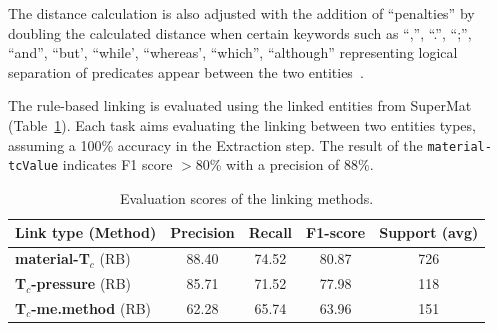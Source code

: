 \documentclass{article}
\newcommand{\tc}{T$_{c}$}
\begin{document}
The distance calculation is also adjusted with the addition of ``penalties'' by doubling the calculated distance when certain keywords such as ``,'', ``.'', ``;'', ``and'', ``but', ``while', ``whereas', ``which'', ``although'' representing logical separation of predicates appear between the two entities~\cite{oka2021table}. 

The rule-based linking is evaluated using the linked entities from SuperMat~\cite{foppiano2021supermat} (Table~\ref{table:evaluation-linking}). 
Each task aims evaluating the linking between two entities types, assuming a 100\% accuracy in the Extraction step. 
The result of the \texttt{material-tcValue} indicates F1 score $>$80\% with a precision of 88\%.

\begin{table}[ht]
\centering\small
\begin{tabular}{lcccc}
\toprule 
\textbf{Link type} (Method) & \textbf{Precision} & \textbf{Recall} & \textbf{F1-score} & Support (avg) \\ 
\midrule
\textbf{material-\tc} (RB)      &  88.40    & 74.52 &    80.87 &   726  \\
\textbf{\tc-pressure} (RB)      & 85.71  &  71.52  &  77.98  &  118     \\
\textbf{\tc-me.method} (RB)     & 62.28 & 65.74 &  63.96  &  151 \\
\bottomrule
\end{tabular}
\caption{\label{table:evaluation-linking} Evaluation scores of the linking methods. }
\end{table}

\end{document}
